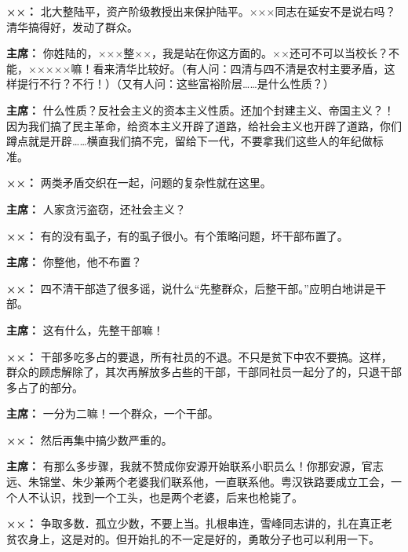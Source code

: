 \begin{list}{}
\item[\textbf{××：}] 北大整陆平，资产阶级教授出来保护陆平。×××同志在延安不是说右吗？清华搞得好，发动了群众。

\item[\textbf{主席：}] 你姓陆的，×××整××，我是站在你这方面的。××还可不可以当校长？不能，×××××嘛！看来清华比较好。（有人问：四清与四不清是农村主要矛盾，这样提行不行？不行！）（又有人问：这些富裕阶层……是什么性质？）

\item[\textbf{主席：}] 什么性质？反社会主义的资本主义性质。还加个封建主义、帝国主义？！因为我们搞了民主革命，给资本主义开辟了道路，给社会主义也开辟了道路，你们蹲点就是开辟……横直我们搞不完，留给下一代，不要拿我们这些人的年纪做标准。

\item[\textbf{××：}] 两类矛盾交织在一起，问题的复杂性就在这里。

\item[\textbf{主席：}] 人家贪污盗窃，还社会主义？

\item[\textbf{××：}] 有的没有虱子，有的虱子很小。有个策略问题，坏干部布置了。

\item[\textbf{主席：}] 你整他，他不布置？

\item[\textbf{××：}] 四不清干部造了很多谣，说什么“先整群众，后整干部。”应明白地讲是干部。

\item[\textbf{主席：}] 这有什么，先整干部嘛！

\item[\textbf{××：}] 干部多吃多占的要退，所有社员的不退。不只是贫下中农不要搞。这样，群众的顾虑解除了，其次再解放多占些的干部，干部同社员一起分了的，只退干部多占了的部分。

\item[\textbf{主席：}] 一分为二嘛！一个群众，一个干部。

\item[\textbf{××：}] 然后再集中搞少数严重的。

\item[\textbf{主席：}] 有那么多步骤，我就不赞成你安源开始联系小职员么！你那安源，官志远、朱锦堂、朱少兼两个老婆我们联系他，一直联系他。粤汉铁路要成立工会，一个人不认识，找到一个工头，也是两个老婆，后来也枪毙了。

\item[\textbf{××：}] 争取多数．孤立少数，不要上当。扎根串连，雪峰同志讲的，扎在真正老贫农身上，这是对的。但开始扎的不一定是好的，勇敢分子也可以利用一下。


\end{list}
